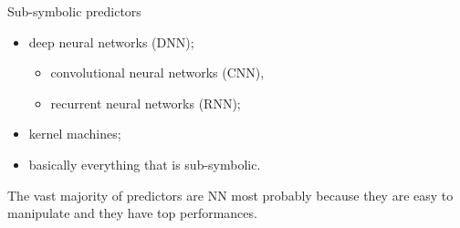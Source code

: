 \documentclass[presentation]{beamer}\mode<presentation>{\usetheme{AMSBolognaFC}}
\begin{document}
\begin{frame}[allowframebreaks]{Sub-symbolic predictors}
    \begin{itemize}
        \item deep neural networks (DNN);
        \begin{itemize}
            \item convolutional neural networks (CNN),
            \item recurrent neural networks (RNN);
        \end{itemize}
        \item kernel machines;
        \item basically everything that is sub-symbolic.
    \end{itemize}
    The vast majority of predictors are NN most probably because they are easy to manipulate and they have top performances.
    
    \framebreak
    
    \begin{figure}
        \centering
        \qquad
        \centering
    \end{figure}
    
\end{frame}
\end{document}
